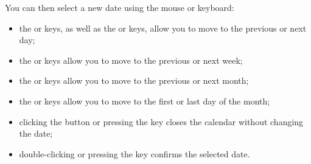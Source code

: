 You can then select a new date using the mouse or keyboard:

\noindent
\begin{minipage}{.65\linewidth}
	\begin{itemize}[rightmargin=.6cm]
		\item the \keys{{+}} or \keys{{-}} keys, as well as the \keys{\arrowkeyleft} or \keys{\arrowkeyright} keys, allow you to move to the previous or next day;
		\item the \keys{\arrowkeyup} or \keys{\arrowkeydown} keys allow you to move to the previous or next week;
		\item the  or  keys allow you to move to the previous or next month;
		\item the  or  keys allow you to move to the first or last day of the month;
		\item clicking the  button or pressing the  key closes the calendar without changing the date;
		\item double-clicking or pressing the  key confirms the selected date.
	\end{itemize}
\end{minipage}
\hspace{10pt}
